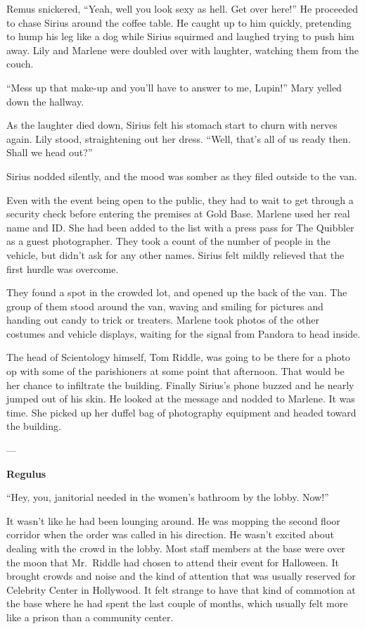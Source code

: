 \documentclass[12pt,twoside,openright]{memoir}
\begin{document}
Remus snickered, ``Yeah, well you look sexy as hell. Get over here!'' He proceeded to chase Sirius around the coffee table. He caught up to him quickly, pretending to hump his leg like a dog while Sirius squirmed and laughed trying to push him away. Lily and Marlene were doubled over with laughter, watching them from the couch. 

``Mess up that make-up and you'll have to answer to me, Lupin!'' Mary yelled down the hallway. 

As the laughter died down, Sirius felt his stomach start to churn with nerves again. Lily stood, straightening out her dress. ``Well, that's all of us ready then. Shall we head out?'' 

Sirius nodded silently, and the mood was somber as they filed outside to the van.

Even with the event being open to the public, they had to wait to get through a security check before entering the premises at Gold Base. Marlene used her real name and ID. She had been added to the list with a press pass for The Quibbler as a guest photographer. They took a count of the number of people in the vehicle, but didn't ask for any other names. Sirius felt mildly relieved that the first hurdle was overcome. 

They found a spot in the crowded lot, and opened up the back of the van. The group of them stood around the van, waving and smiling for pictures and handing out candy to trick or treaters. Marlene took photos of the other costumes and vehicle displays, waiting for the signal from Pandora to head inside. 

The head of Scientology himself, Tom Riddle, was going to be there for a photo op with some of the parishioners at some point that afternoon. That would be her chance to infiltrate the building. Finally Sirius's phone buzzed and he nearly jumped out of his skin. He looked at the message and nodded to Marlene. It was time. She picked up her duffel bag of photography equipment and headed toward the building.

---

\textbf{Regulus} 

``Hey, you, janitorial needed in the women's bathroom by the lobby. Now!'' 

It wasn't like he had been lounging around. He was mopping the second floor corridor when the order was called in his direction. He wasn't excited about dealing with the crowd in the lobby. Most staff members at the base were over the moon that Mr.\ Riddle had chosen to attend their event for Halloween. It brought crowds and noise and the kind of attention that was usually reserved for Celebrity Center in Hollywood. It felt strange to have that kind of commotion at the base where he had spent the last couple of months, which usually felt more like a prison than a community center.
\end{document}
